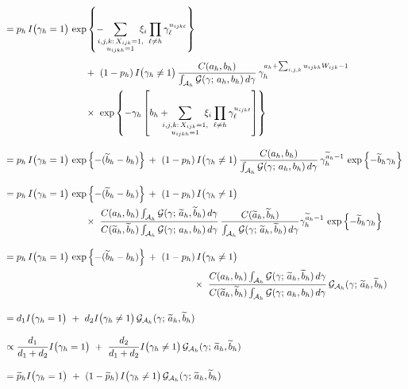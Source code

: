 \documentclass[11pt]{article}
\newcommand{\ind}{I}
\newcommand{\gammaExprUisOne}{ \hspace{3mm} \sum_{\mathclap{\substack{i,j,k{:}\, X_{ijk}=1, \\ u_{ijkh} = 1}}} \hspace{4mm} \xi_i \prod_{\ell \ne h} \gamma_\ell^{ u_{ijk\ell} } }
\begin{document}
\begin{enumerate}[label=Step \arabic*., leftmargin=13mm, itemsep=10mm]
\begin{align*}
&= p_h\, \ind\big( \gamma_h = 1 \big)\, \exp\left\{ -\gammaExprUisOne \right\} \\[1ex]
& \hspace{30mm} +~ (1 - p_h)\, \ind\big(\gamma_h \ne 1 \big)\, \frac{ C(a_h,b_h) }{ \int_{\mathcal{A}_h} \mathcal{G}(\gamma;\, a_h,b_h)\, d\gamma }\, \gamma_h^{ a_h + \sum_{i,j,k} u_{ijkh} W_{ijk} - 1 } \\
& \hspace{30mm} \times~ \exp\left\{ -\gamma_h \left[ b_h + \gammaExprUisOne  \right] \right\} \\[2ex]
&= p_h\, \ind\big( \gamma_h = 1 \big)\, \exp\left\{ -(\widetilde{b}_h - b_h) \right\} \,+~ (1 - p_h)\, \ind\big( \gamma_h \ne 1 \big)\, \frac{ C(a_h,b_h) }{ \int_{\mathcal{A}_h} \mathcal{G}(\gamma;\, a_h,b_h)\, d\gamma }\, \gamma_h^{ \widetilde{a}_h - 1 }\, \exp\left\{ -\widetilde{b}_h \gamma_h \right\} \\[2ex]
&= p_h\, \ind\big( \gamma_h = 1 \big)\, \exp\left\{ -(\widetilde{b}_h - b_h) \right\} \,+~ (1 - p_h)\, \ind\big( \gamma_h \ne 1 \big) \\
& \hspace{30mm} \times~ \frac{ C(a_h,b_h) \int_{\mathcal{A}_h} \mathcal{G}(\gamma;\, \widetilde{a}_h, \widetilde{b}_h)\, d\gamma }{ C(\widetilde{a}_h, \widetilde{b}_h) \int_{\mathcal{A}_h} \mathcal{G}(\gamma;\, a_h, b_h)\, d\gamma }\, \frac{ C( \widetilde{a}_h, \widetilde{b}_h) }{ \int_{\mathcal{A}_h} \mathcal{G}(\gamma;\, \widetilde{a}_h, \widetilde{b}_h)\, d\gamma } \gamma_h^{ \widetilde{a}_h - 1 }\, \exp\left\{ -\widetilde{b}_h \gamma_h \right\} \\[2ex]
&= p_h\, \ind\big( \gamma_h = 1 \big)\, \exp\left\{ -(\widetilde{b}_h - b_h) \right\} \,+~ (1 - p_h)\, \ind\big( \gamma_h \ne 1 \big)\, \\
& \hspace{70mm} \times~ \frac{ C(a_h,b_h) \int_{\mathcal{A}_h} \mathcal{G}(\gamma;\, \widetilde{a}_h, \widetilde{b}_h)\, d\gamma }{ C(\widetilde{a}_h, \widetilde{b}_h) \int_{\mathcal{A}_h} \mathcal{G}(\gamma;\, a_h, b_h)\, d\gamma }\, \mathcal{G}_{\mathcal{A}_h} (\gamma;\, \widetilde{a}_h, \widetilde{b}_h) \\[2ex]
&= d_1 \ind\big( \gamma_h = 1 \big) ~+~ d_2 \ind\big( \gamma_h \ne 1 \big)\, \mathcal{G}_{\mathcal{A}_h} (\gamma;\, \widetilde{a}_h, \widetilde{b}_h) \\[2ex]
&\propto \frac{ d_1 }{ d_1 + d_2 } \ind\big( \gamma_h = 1 \big) ~+~ \frac{ d_2 }{ d_1 + d_2 } \ind\big( \gamma_h \ne 1 \big)\, \mathcal{G}_{\mathcal{A}_h} (\gamma;\, \widetilde{a}_h, \widetilde{b}_h) \\[2ex]
&= \widetilde{p}_h \ind\big( \gamma_h = 1 \big) ~+~ (1 - \widetilde{p}_h)\, \ind\big( \gamma_h \ne 1 \big)\, \mathcal{G}_{\mathcal{A}_h} (\gamma;\, \widetilde{a}_h, \widetilde{b}_h) 
\end{align*} 





\end{enumerate}
\end{document}
